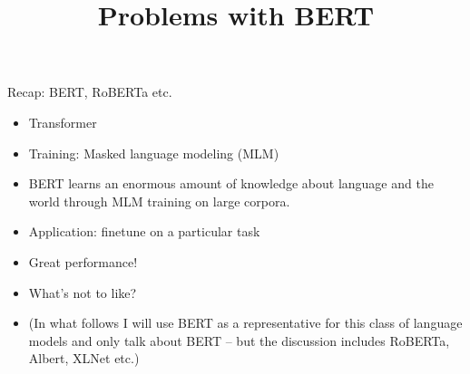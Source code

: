



\newcommand{\learninggoals}{
\item Recap BERT-like models
\item Understand problems models following this paradigm have}
\def\myblue#1{\textcolor{texblue}{#1}}

\title{Problems with BERT}
\date{}




\begin{frame}{Recap: BERT, RoBERTa etc.}

\vfill

  \begin{itemize}
\item Transformer
\item Training: Masked language modeling (MLM)
\item BERT learns an enormous amount of knowledge
about language and the world through MLM training on large corpora.
\item Application: finetune on a particular task
\item Great performance!
\item What's not to like?
\item (In what follows I will use BERT as a
representative for this class of language models and only
talk about BERT -- but the discussion includes RoBERTa,
Albert, XLNet etc.)
    \end{itemize}

\vfill

\end{frame}


